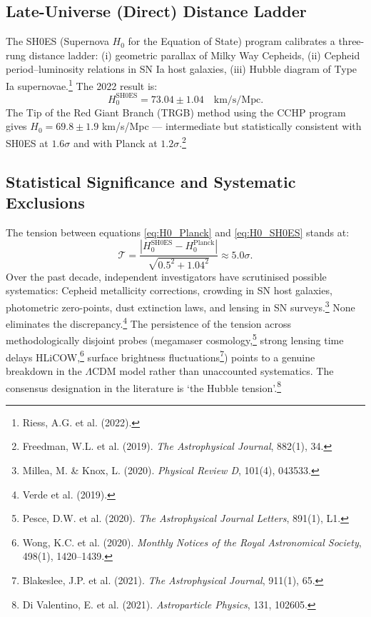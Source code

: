 \documentclass[12pt,a4paper]{book}
\theoremstyle{definition}
\theoremstyle{remark}
\begin{document}
\subsection{Late-Universe (Direct) Distance Ladder}

The SH0ES (Supernova $H_0$ for the Equation of State) program calibrates a three-rung distance ladder: (i) geometric parallax of Milky Way Cepheids, (ii) Cepheid period--luminosity relations in SN Ia host galaxies, (iii) Hubble diagram of Type Ia supernovae.\footnote{Riess, A.G. et al. (2022).} The 2022 result is:
\begin{equation}
    H_0^{\mathrm{SH0ES}} = 73.04 \pm 1.04 \quad \text{km/s/Mpc}.
    \label{eq:H0_SH0ES}
\end{equation}
The Tip of the Red Giant Branch (TRGB) method using the CCHP program gives $H_0 = 69.8 \pm 1.9$ km/s/Mpc --- intermediate but statistically consistent with SH0ES at $1.6\sigma$ and with Planck at $1.2\sigma$.\footnote{Freedman, W.L. et al. (2019). \textit{The Astrophysical Journal}, 882(1), 34.}

\subsection{Statistical Significance and Systematic Exclusions}

The tension between equations \eqref{eq:H0_Planck} and \eqref{eq:H0_SH0ES} stands at:
\begin{equation}
    \mathcal{T} = \frac{|H_0^{\mathrm{SH0ES}} - H_0^{\mathrm{Planck}}|}{\sqrt{0.5^2 + 1.04^2}} \approx 5.0\sigma.
    \label{eq:tension}
\end{equation}
Over the past decade, independent investigators have scrutinised possible systematics: Cepheid metallicity corrections, crowding in SN host galaxies, photometric zero-points, dust extinction laws, and lensing in SN surveys.\footnote{Millea, M. \& Knox, L. (2020). \textit{Physical Review D}, 101(4), 043533.} None eliminates the discrepancy.\footnote{Verde et al. (2019).} The persistence of the tension across methodologically disjoint probes (megamaser cosmology,\footnote{Pesce, D.W. et al. (2020). \textit{The Astrophysical Journal Letters}, 891(1), L1.} strong lensing time delays HLiCOW,\footnote{Wong, K.C. et al. (2020). \textit{Monthly Notices of the Royal Astronomical Society}, 498(1), 1420--1439.} surface brightness fluctuations\footnote{Blakeslee, J.P. et al. (2021). \textit{The Astrophysical Journal}, 911(1), 65.}) points to a genuine breakdown in the $\Lambda$CDM model rather than unaccounted systematics. The consensus designation in the literature is `the Hubble tension'.\footnote{Di Valentino, E. et al. (2021). \textit{Astroparticle Physics}, 131, 102605.}
\end{document}

